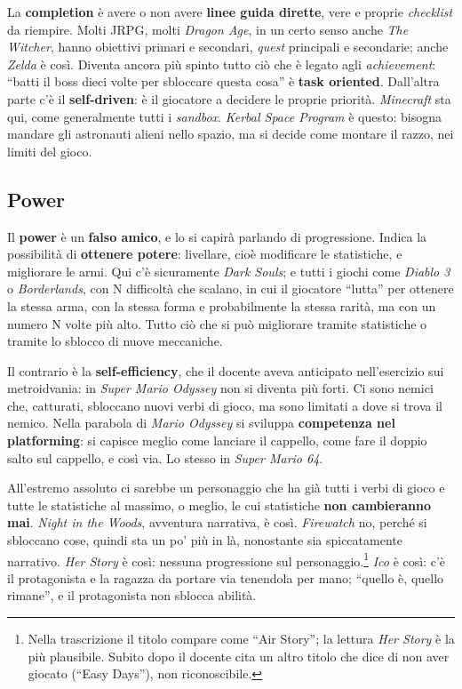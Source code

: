 La \textbf{completion} è avere o non avere \textbf{linee guida dirette}, vere
e proprie \emph{checklist} da riempire. Molti JRPG, molti \emph{Dragon Age},
in un certo senso anche \emph{The Witcher}, hanno obiettivi primari e
secondari, \emph{quest} principali e secondarie; anche \emph{Zelda} è così.
Diventa ancora più spinto tutto ciò che è legato agli \emph{achievement}:
``batti il boss dieci volte per sbloccare questa cosa'' è \textbf{task
oriented}. Dall'altra parte c'è il \textbf{self-driven}: è il giocatore a
decidere le proprie priorità. \emph{Minecraft} sta qui, come generalmente
tutti i \emph{sandbox}. \emph{Kerbal Space Program} è questo: bisogna mandare
gli astronauti alieni nello spazio, ma si decide come montare il razzo, nei
limiti del gioco.

\subsection{Power}

Il \textbf{power} è un \textbf{falso amico}, e lo si capirà parlando di
progressione. Indica la possibilità di \textbf{ottenere potere}: livellare,
cioè modificare le statistiche, e migliorare le armi. Qui c'è sicuramente
\emph{Dark Souls}; e tutti i giochi come \emph{Diablo 3} o \emph{Borderlands},
con N difficoltà che scalano, in cui il giocatore ``lutta'' per ottenere la
stessa arma, con la stessa forma e probabilmente la stessa rarità, ma con un
numero N volte più alto. Tutto ciò che si può migliorare tramite statistiche
o tramite lo sblocco di nuove meccaniche.

Il contrario è la \textbf{self-efficiency}, che il docente aveva anticipato
nell'esercizio sui metroidvania: in \emph{Super Mario Odyssey} non si diventa
più forti. Ci sono nemici che, catturati, sbloccano nuovi verbi di gioco, ma
sono limitati a dove si trova il nemico. Nella parabola di \emph{Mario
Odyssey} si sviluppa \textbf{competenza nel platforming}: si capisce meglio
come lanciare il cappello, come fare il doppio salto sul cappello, e così via.
Lo stesso in \emph{Super Mario 64}.

All'estremo assoluto ci sarebbe un personaggio che ha già tutti i verbi di
gioco e tutte le statistiche al massimo, o meglio, le cui statistiche
\textbf{non cambieranno mai}. \emph{Night in the Woods}, avventura narrativa, è
così. \emph{Firewatch} no, perché si sbloccano cose, quindi sta un po' più in
là, nonostante sia spiccatamente narrativo. \emph{Her Story} è così: nessuna
progressione sul personaggio.\footnote{Nella trascrizione il titolo compare
come ``Air Story''; la lettura \emph{Her Story} è la più plausibile. Subito
dopo il docente cita un altro titolo che dice di non aver giocato (``Easy
Days''), non riconoscibile.} \emph{Ico} è così: c'è il protagonista e la
ragazza da portare via tenendola per mano; ``quello è, quello rimane'', e il
protagonista non sblocca abilità.

